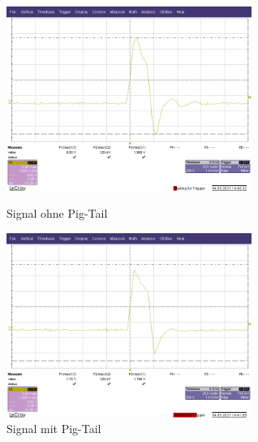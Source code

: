 \documentclass[a4paper,11pt]{scrartcl}
\begin{document}
\begin{figure}[htb]
    \centering
    \begin{minipage}[t]{0.45\linewidth}
        \centering
        \includegraphics[width=8cm]{Bilder/TP19-ohne-PigTail.png}
        \caption{Signal ohne Pig-Tail}
    \end{minipage}%
    \hfill
    \begin{minipage}[t]{0.45\linewidth}
        \centering
        \includegraphics[width=8cm]{Bilder/TP19-mit-PigTail.png}
        \caption{Signal mit Pig-Tail}
    \end{minipage}
\end{figure}
\end{document}
